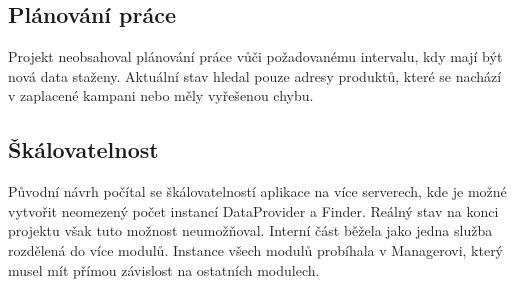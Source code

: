 \documentclass[thesis=B,czech]{FITthesis}[2012/06/26]
\begin{document}
\subsection{Plánování práce}
Projekt neobsahoval plánování práce vůči požadovanému intervalu, kdy mají být nová data
staženy. Aktuální stav hledal pouze adresy produktů, které se nachází v zaplacené kampani nebo měly vyřešenou chybu.
\subsection{Škálovatelnost}
Původní návrh počítal se škálovatelností aplikace na více serverech, kde je možné vytvořit neomezený počet instancí DataProvider a Finder. Reálný stav na konci projektu však tuto možnost neumožňoval. Interní část běžela jako jedna služba rozdělená do více modulů. 
Instance všech modulů probíhala v Managerovi, který musel mít přímou závislost na ostatních modulech.
\end{document}
